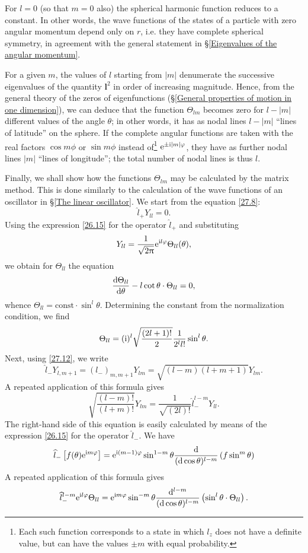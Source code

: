 For $ l = 0 $ (so that $ m = 0 $ also) the spherical harmonic function reduces to a constant. In other words, the wave functions of the states of a particle with zero angular momentum depend only on $ r $, i.e. they have complete spherical symmetry, in agreement with the general statement in \S\ref{Eigenvalues of the angular momentum}.

For a given $ m $, the values of $ l $ starting from $ |m| $ denumerate the successive eigenvalues of the quantity $ \bm{l}^2 $ in order of increasing magnitude. Hence, from the general theory of the zeros of eigenfunctions (\S\ref{General properties of motion in one dimension}), we can deduce that the function $\Theta_{lm}$ becomes zero for $ l - |m| $ different values of the angle $\theta$; in other words, it has as nodal lines $ l - |m| $ “lines of latitude” on the sphere. If the complete angular functions are taken with the real factors $\cos m\phi$ or $ \sin m\phi $ instead of\footnote{Each such function corresponds to a state in which $ l_z $ does not have a definite value, but can have the values $\pm m$ with equal probability.} $ \mathrm{e}^{\pm\mathrm{i}|m|\varphi} $, they have as further nodal lines $ |m| $ “lines of longitude”; the total number of nodal lines is thus $ l $.

Finally, we shall show how the functions $\Theta_{lm}$ may be calculated by the matrix method. This is done similarly to the calculation of the wave functions of an oscillator in \S\ref{The linear oscillator}. We start from the equation \eqref{27.8}:
\[ \hat{l}_+Y_{ll}=0. \]
Using the expression \eqref{26.15} for the operator $\hat{l}_+$ and substituting
\[ Y_{ll}=\frac{1}{\sqrt{2\uppi}}\mathrm{e}^{\mathrm{i} l\varphi}\Theta_{ll}(\theta), \]
we obtain for $\Theta_{ll}$ the equation
\[ \frac{\mathrm{d}\Theta_{ll}}{\mathrm{d}\theta}-l\cot\theta\cdot\Theta_{ll}=0, \]
whence $ \Theta_{ll} = \mathrm{const}\cdot\sin^l\theta $. Determining the constant from the normalization condition, we find
\begin{equation}\label{28.10}
\Theta_{ll}=(\mathrm{i})^l\sqrt{\frac{(2l+1)!}{2}}\frac{1}{2^ll!}\sin^l\theta.
\end{equation}
Next, using \eqref{27.12}, we write
\[ \hat{l}_-Y_{l,m+1}=(l_-)_{m,m+1}Y_{lm}=\sqrt{(l-m)(l+m+1)}Y_{lm}. \]
A repeated application of this formula gives
\[ \sqrt{\frac{(l-m)!}{(l+m)!}}Y_{lm}=\frac{1}{\sqrt{(2l)!}}\hat{l}_-^{l-m}Y_{ll}. \]
The right-hand side of this equation is easily calculated by means of the expression \eqref{26.15} for the operator $\hat{l}_-$. We have
\[ \widehat{l}_-\left[f(\theta)\mathrm{e}^{\mathrm{i} m\varphi} \right]=\mathrm{e}^{\mathrm{i}(m-1)\varphi}\sin^{1-m}\theta\frac{\mathrm{d}}{(\mathrm{d}\cos\theta)^{l-m}}\left(f\sin^m\theta \right) \]
A repeated application of this formula gives
\[ \widehat{l}_-^{l-m}\mathrm{e}^{\mathrm{i} l\varphi}\Theta_{ll}=\mathrm{e}^{\mathrm{i} m\varphi}\sin^{-m}\theta\frac{\mathrm{d}^{l-m}}{(\mathrm{d}\cos\theta)^{l-m}}\left(\sin^l\theta\cdot\Theta_{ll} \right) .\]



